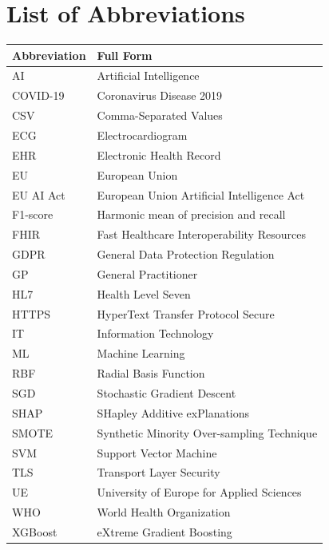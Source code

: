 \chapter*{List of Abbreviations}

\begin{tabular}{@{}p{3.5cm}p{11cm}@{}}
\toprule
\textbf{Abbreviation} & \textbf{Full Form} \\
\midrule
AI         & Artificial Intelligence \\
COVID-19   & Coronavirus Disease 2019 \\
CSV        & Comma-Separated Values \\
ECG        & Electrocardiogram \\
EHR        & Electronic Health Record \\
EU         & European Union \\
EU AI Act  & European Union Artificial Intelligence Act \\
F1-score   & Harmonic mean of precision and recall \\
FHIR       & Fast Healthcare Interoperability Resources \\
GDPR       & General Data Protection Regulation \\
GP         & General Practitioner \\
HL7        & Health Level Seven \\
HTTPS      & HyperText Transfer Protocol Secure \\
IT         & Information Technology \\
ML         & Machine Learning \\
RBF        & Radial Basis Function \\
SGD        & Stochastic Gradient Descent \\
SHAP       & SHapley Additive exPlanations \\
SMOTE      & Synthetic Minority Over-sampling Technique \\
SVM        & Support Vector Machine \\
TLS        & Transport Layer Security \\
UE         & University of Europe for Applied Sciences \\
WHO        & World Health Organization \\
XGBoost    & eXtreme Gradient Boosting \\
\bottomrule
\end{tabular}
